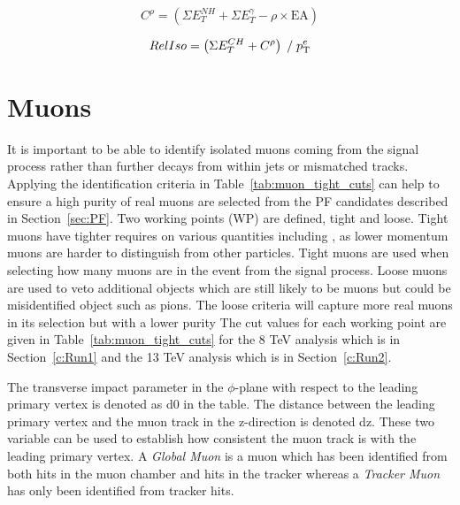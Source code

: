 \begin{centering}
\begin{equation}
C^{\rho} = \left( \Sigma E_{T}^{NH} + \Sigma E_{T}^{\gamma} - \rho\times\textrm{EA} \right) 
\label{eqn:rhoCorr}
\end{equation}
\end{centering}


\begin{centering}
\begin{equation}
RelIso = \left( \Sigma E_{T}^{CH} + C^{\rho} \right) \; / \;   p_{\mathrm{T}}^{e}
\label{eqn:eRelIso}
\end{equation}
\end{centering}

\section{Muons \label{sec:muonreco}}

It is important to be able to identify isolated muons coming from the signal process rather than further decays from within jets or mismatched tracks. Applying the identification criteria in Table~\ref{tab:muon_tight_cuts} can help to ensure a high purity of real muons are selected from the PF candidates described in Section~\ref{sec:PF}. Two working points (WP) are defined, tight and loose. Tight muons have tighter requires on various quantities including \pt, as lower momentum muons are harder to distinguish from other particles. Tight muons are used when selecting how many muons are in the event from the signal process. Loose muons are used to veto additional objects which are still likely to be muons but could be misidentified object such as pions. The loose criteria will capture more real muons in its selection but with a lower purity
The cut values for each working point are given in Table~\ref{tab:muon_tight_cuts} for the 8 TeV analysis which is in Section~\ref{c:Run1} and the 13 TeV analysis which is in Section~\ref{c:Run2}.

The transverse impact parameter in the $\phi$-plane with respect to the leading primary vertex is denoted as d0 in the table. The distance between the leading primary vertex and the muon track in the z-direction is denoted dz. These two variable can be used to establish how consistent the muon track is with the leading primary vertex.
A \emph{Global Muon} is a muon which has been identified from both hits in the muon chamber and hits in the tracker whereas a \emph{Tracker Muon} has only been identified from tracker hits.


